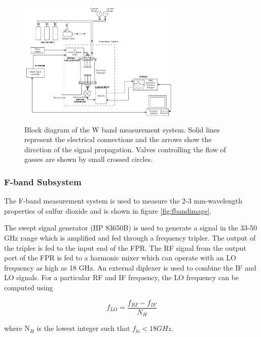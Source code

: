 \begin{figure}[H]
    \centering
	\includegraphics[width=0.7\textwidth]{./images/w-bandsystem.png}
	\caption{Block diagram of the W band measurement system. Solid lines represent the electrical connections and the arrows show the direction of the signal propagation. Valves controlling the flow of gasses are shown by small crossed circles.}
    \label{fig:wbandimage}
\end{figure}


\subsubsection{F-band Subsystem}
The F-band measurement system is used to measure the 2-3 mm-wavelength properties of sulfur dioxide and is shown in figure \ref{fig:fbandimage}.

The swept signal generator (HP 83650B) is used to generate a signal in the 33-50 GHz range which
is amplified and fed through a frequency tripler. The output of the tripler is fed to the input end of the FPR. The RF signal from the output port of the FPR is fed to a harmonic mixer which can operate with an LO frequency as high as 18 GHz. An external diplexer is used to combine the IF and LO signals. For a particular RF and IF frequency,  the LO frequency can be computed using

\begin{equation} \label{eq:fbandlo}
f_{LO} = \frac{f_{RF} - f_{IF}}{N_H	}
\end{equation}

\noindent where N$_H$ is the lowest integer such that $f_{lo} < 18 GHz$.

